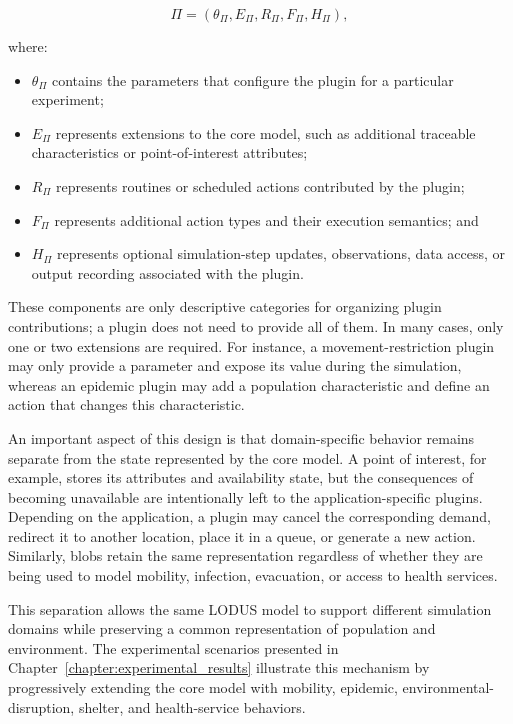 \begin{equation}
\Pi =
\left(
\theta_{\Pi},
E_{\Pi},
R_{\Pi},
F_{\Pi},
H_{\Pi}
\right),
\label{eq:extension}
\end{equation}


where:

\begin{itemize}
    \item $\theta_{\Pi}$ contains the parameters that configure the plugin for a particular experiment;

    \item $E_\Pi$ represents extensions to the core model, such as additional traceable characteristics or point-of-interest attributes;

    \item $R_{\Pi}$ represents routines or scheduled actions contributed by the plugin;

    \item $F_{\Pi}$ represents additional action types and their execution semantics; and

    \item $H_{\Pi}$ represents optional simulation-step updates, observations, data access, or output recording associated with the plugin.
\end{itemize}

These components are only descriptive categories for organizing plugin contributions; a plugin does not need to provide all of them. 
In many cases, only one or two extensions are required. For instance, a movement-restriction plugin may only provide a parameter and expose its value during the simulation, whereas an epidemic plugin may add a population characteristic and define an action that changes this characteristic.

An important aspect of this design is that domain-specific behavior remains separate from the state represented by the core model. A point of interest, for example, stores its attributes and availability state, but the consequences of becoming unavailable are intentionally left to the application-specific plugins. Depending on the application, a plugin may cancel the corresponding demand, redirect it to another location, place it in a queue, or generate a new action. 
Similarly, blobs retain the same representation regardless of whether they are being used to model mobility, infection, evacuation, or access to health services.

This separation allows the same LODUS model to support different simulation domains while preserving a common representation of population and environment.
The experimental scenarios presented in Chapter~\ref{chapter:experimental_results} illustrate this mechanism by progressively extending the core model with mobility, epidemic, environmental-disruption, shelter, and health-service
behaviors.

